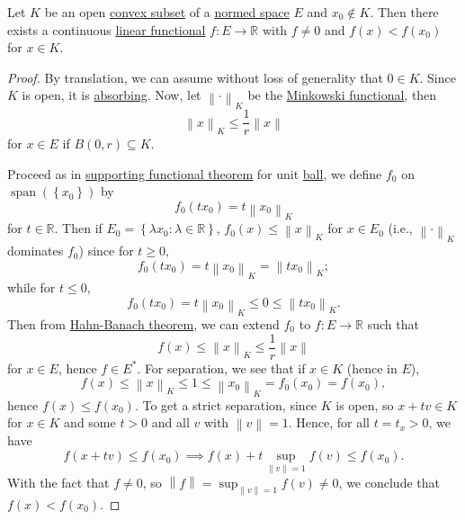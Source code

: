 \begin{theorem}\label{thm:separation-of-a-point-from-a-convex-set}
	Let \(K\) be an open \hyperref[def:convex-set]{convex subset} of a \hyperref[def:normed-vector-space]{normed space} \(E\) and \(x_0 \notin K\). Then there exists a continuous \hyperref[def:linear-functional]{linear functional} \(f\colon E\to \mathbb{R} \) with \(f\neq 0\) and \(f(x) < f(x_0)\) for \(x\in K\).
\end{theorem}
\begin{proof}
	By translation, we can assume without loss of generality that \(0\in K\). Since \(K\) is open, it is \hyperref[def:absorbing]{absorbing}. Now, let \(\left\lVert \cdot\right\rVert _K\) be the \hyperref[def:Minkowski-functional]{Minkowski functional}, then
	\[
		\left\lVert x\right\rVert _K \leq \frac{1}{r}\left\lVert x\right\rVert
	\]
	for \(x\in E\) if \(B(0, r)\subseteq K\).
	\begin{center}
	\end{center}
	Proceed as in \hyperref[thm:supporting-functional]{supporting functional theorem} for unit \hyperref[def:ball]{ball}, we define \(f_0\) on \(\mathop{\mathrm{span}}(\left\{ x_0 \right\} )\) by
	\[
		f_0(tx_0) = t\left\lVert x_0\right\rVert_K
	\]
	for \(t\in \mathbb{R} \). Then if \(E_0 = \left\{ \lambda x_0 \colon \lambda \in \mathbb{R}  \right\} \), \(f_0 (x) \leq \left\lVert x\right\rVert _K\) for \(x\in E_0\) (i.e., \(\left\lVert \cdot\right\rVert _K\) dominates \(f_0\)) since for \(t \geq 0\),
	\[
		f_0 (tx_0) = t \left\lVert x_0\right\rVert _K= \left\lVert t x_0\right\rVert _K;
	\]
	while for \(t \leq 0\),
	\[
		f_0 ( tx_0) = t\left\lVert x_0\right\rVert _K \leq 0\leq \left\lVert t x_0\right\rVert _K.
	\]
	Then from \hyperref[thm:Hahn-Banach]{Hahn-Banach theorem}, we can extend \(f_0\) to \(f\colon E\to \mathbb{R} \) such that
	\[
		f(x) \leq \left\lVert x\right\rVert _K \leq \frac{1}{r} \left\lVert x\right\rVert
	\]
	for \(x\in E\), hence \(f\in E^{\ast} \). For separation, we see that if \(x\in K\) (hence in \(E\)),
	\[
		f(x) \leq \left\lVert x\right\rVert _K \leq 1 \leq \left\lVert x_0\right\rVert _K = f_0 (x_0) = f(x_0),
	\]
	hence \(f(x) \leq f(x_0)\). To get a strict separation, since \(K\) is open, so \(x + tv\in K\) for \(x\in K\) and some \(t > 0\) and all \(v\) with \(\left\lVert v\right\rVert = 1\). Hence, for all \(t = t_x > 0\), we have
	\[
		f(x + tv) \leq f(x_0) \implies f(x) + t \sup _{\left\lVert v\right\rVert = 1}f(v) \leq f(x_0).
	\]
	With the fact that \(f\neq 0\), so \(\left\lVert f\right\rVert = \sup _{\left\lVert v\right\rVert = 1}f(v) \neq 0\), we conclude that \(f(x) < f(x_0)\).
\end{proof}

